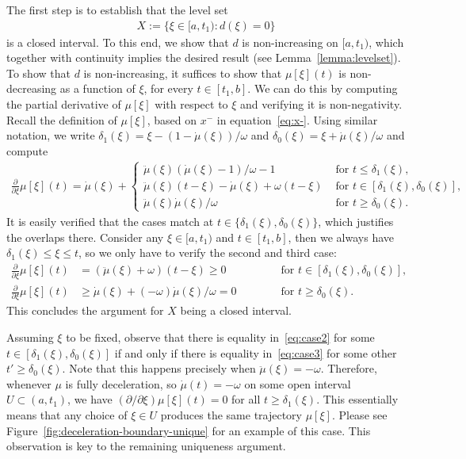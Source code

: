\documentclass[a4paper]{report}
\theoremstyle{definition}
\theoremstyle{plain}
\newcommand\halfopen[2]{\ensuremath{[#1,#2)}}
\begin{document}
The first step is to establish that the level set
\begin{align}
  X := \{ \xi \in \halfopen{a}{t_{1}} : d(\xi) = 0 \}
\end{align}
is a closed interval. To this end, we show that $d$ is non-increasing on
$\halfopen{a}{t_{1}}$, which together with continuity implies the desired result
(see Lemma~\ref{lemma:levelset}).
%
To show that $d$ is non-increasing, it suffices to show that $\mu[\xi](t)$ is
non-decreasing as a function of $\xi$, for every $t \in [t_{1}, b]$.
%
We can do this by computing the partial derivative of $\mu[\xi]$ with respect to $\xi$
and verifying it is non-negativity.
%
Recall the definition of $\mu[\xi]$, based on $x^{-}$ in equation~\eqref{eq:x-}.
%
Using similar notation, we write
$\delta_{1}(\xi) = \xi - (1 - \dot{\mu}(\xi))/\omega$ and
$\delta_{0}(\xi) = \xi + \dot{\mu}(\xi)/\omega$ and compute
%
\begin{align}
  \frac{\partial}{\partial \xi} \mu[\xi](t) =
  \dot{\mu}(\xi) +
  \begin{cases}
    \ddot{\mu}(\xi)(\dot{\mu}(\xi)-1)/\omega - 1 &\text{ for } t \leq \delta_{1}(\xi) , \\
    \ddot{\mu}(\xi)(t-\xi) - \dot{\mu}(\xi) + \omega(t-\xi) &\text{ for } t \in [\delta_{1}(\xi),\delta_{0}(\xi)] , \\
    \ddot{\mu}(\xi)\dot{\mu}(\xi)/ \omega &\text{ for } t \geq \delta_{0}(\xi) .
  \end{cases}
\end{align}
%
It is easily verified that the cases match at
$t \in \{\delta_{1}(\xi), \delta_{0}(\xi)\}$, which justifies the overlaps there.
%
Consider any $\xi \in \halfopen{a}{t_{1}}$ and $t \in [t_{1}, b]$, then we always have
$\delta_{1}(\xi) \leq \xi \leq t$, so we only have to verify the second and third case:
%
\begin{subequations}
\begin{alignat}{2}
  \frac{\partial}{\partial \xi} \mu[\xi](t) &= (\ddot{\mu}(\xi) + \omega)(t-\xi) \geq 0 \quad\quad\quad &&\text{ for } t \in [\delta_{1}(\xi) ,\delta_{0}(\xi)], \label{eq:case2} \\
  \frac{\partial}{\partial \xi} \mu[\xi](t) &\geq \dot{\mu}(\xi) + (-\omega)\dot{\mu}(\xi)/\omega = 0 &&\text{ for } t \geq \delta_{0}(\xi) . \label{eq:case3}
\end{alignat}
\end{subequations}
%
This concludes the argument for $X$ being a closed interval.

Assuming $\xi$ to be fixed, observe that there is equality in~\eqref{eq:case2} for some
$t \in [\delta_{1}(\xi), \delta_{0}(\xi)]$ if and only if there is equality in~\eqref{eq:case3}
for some other $t' \geq \delta_{0}(\xi)$. Note that this happens precisely when
$\ddot{\mu}(\xi) = -\omega$.
%
Therefore, whenever $\mu$ is fully deceleration, so $\dot{\mu}(t)=-\omega$ on
some open interval $U \subset (a, t_{1})$, we have
$(\partial/\partial \xi) \mu[\xi](t) = 0$ for all $t \geq \delta_{1}(\xi)$.
%
This essentially means that any choice of $\xi \in U$ produces the same
trajectory $\mu[\xi]$. Please see Figure~\ref{fig:deceleration-boundary-unique}
for an example of this case.
%
This observation is key to the remaining uniqueness argument.
\end{document}
